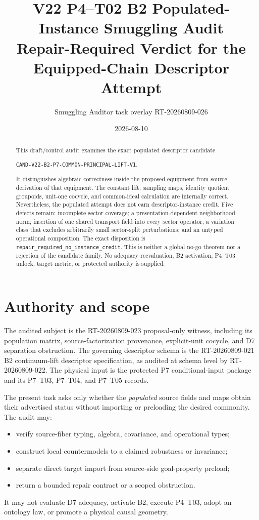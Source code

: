 \documentclass[11pt]{article}
\title{V22 P4--T02 B2 Populated-Instance Smuggling Audit\\
\large Repair-Required Verdict for the Equipped-Chain Descriptor Attempt}
\author{Smuggling Auditor task overlay RT-20260809-026}
\date{2026-08-10}
\begin{document}
\maketitle

\begin{abstract}
This draft/control audit examines the exact populated descriptor candidate
\begin{center}
\small\texttt{CAND-V22-B2-P7-COMMON-PRINCIPAL-LIFT-V1}.
\end{center}
It distinguishes algebraic
correctness inside the proposed equipment from source derivation of that
equipment.  The constant lift, sampling maps, identity quotient groupoids,
unit-one cocycle, and common-ideal calculation are internally correct.
Nevertheless, the populated attempt does not earn descriptor-instance credit.
Five defects remain: incomplete sector coverage; a presentation-dependent
neighborhood norm; insertion of one shared transport field into every sector
operator; a variation class that excludes arbitrarily small sector-split
perturbations; and an untyped operational composition.  The exact disposition
is \nolinkurl{repair_required_no_instance_credit}.  This is neither a global
no-go theorem nor a rejection of the candidate family.  No adequacy
reevaluation, B2 activation, P4--T03 unlock, target metric, or protected
authority is supplied.
\end{abstract}

\section{Authority and scope}

The audited subject is the RT-20260809-023 proposal-only witness, including
its population matrix, source-factorization provenance, explicit-unit
cocycle, and D7 separation obstruction.  The governing descriptor schema is
the RT-20260809-021 B2 continuum-lift descriptor specification, as audited at
schema level by RT-20260809-022.  The physical input is the protected P7
conditional-input package and its P7--T03, P7--T04, and P7--T05 records.

The present task asks only whether the \emph{populated} source fields and maps
obtain their advertised status without importing or preloading the desired
commonity.  The audit may:
\begin{itemize}[leftmargin=2em]
  \item verify source-fiber typing, algebra, covariance, and operational types;
  \item construct local countermodels to a claimed robustness or invariance;
  \item separate direct target import from source-side goal-property preload;
  \item return a bounded repair contract or a scoped obstruction.
\end{itemize}
It may not evaluate D7 adequacy, activate B2, execute P4--T03, adopt an
ontology law, or promote a physical causal geometry.
\end{document}
